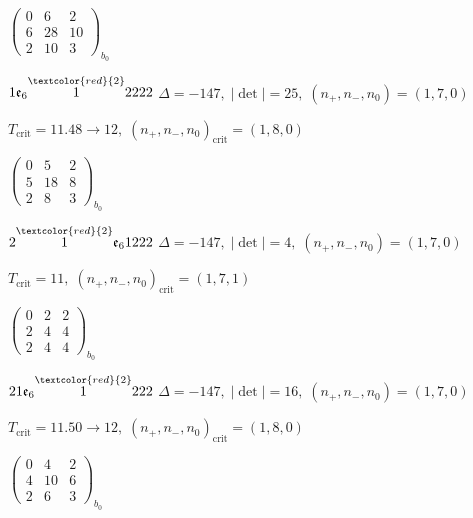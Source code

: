 \documentclass[10pt]{article}
\begin{document}
\hspace{2em}$\left(\begin{smallmatrix}0 & 6 & 2 \\ 6 & 28 & 10 \\ 2 & 10 & 3\end{smallmatrix}\right)_{\!b_0}$

\smallskip

$1\mathfrak{e}_6\overset{\textcolor{red}{2}}{1}2222$ \quad $\Delta=-147,\; |\det|=25,\; (n_+,n_-,n_0)=(1,7,0)$

\hspace{1em}$T_{\text{crit}}=11.48 \to 12,\; (n_+,n_-,n_0)_{\text{crit}}=(1,8,0)$

\hspace{2em}$\left(\begin{smallmatrix}0 & 5 & 2 \\ 5 & 18 & 8 \\ 2 & 8 & 3\end{smallmatrix}\right)_{\!b_0}$

\smallskip

$2\overset{\textcolor{red}{2}}{1}\mathfrak{e}_61222$ \quad $\Delta=-147,\; |\det|=4,\; (n_+,n_-,n_0)=(1,7,0)$

\hspace{1em}$T_{\text{crit}}=11,\; (n_+,n_-,n_0)_{\text{crit}}=(1,7,1)$

\hspace{2em}$\left(\begin{smallmatrix}0 & 2 & 2 \\ 2 & 4 & 4 \\ 2 & 4 & 4\end{smallmatrix}\right)_{\!b_0}$

$21\mathfrak{e}_6\overset{\textcolor{red}{2}}{1}222$ \quad $\Delta=-147,\; |\det|=16,\; (n_+,n_-,n_0)=(1,7,0)$

\hspace{1em}$T_{\text{crit}}=11.50 \to 12,\; (n_+,n_-,n_0)_{\text{crit}}=(1,8,0)$

\hspace{2em}$\left(\begin{smallmatrix}0 & 4 & 2 \\ 4 & 10 & 6 \\ 2 & 6 & 3\end{smallmatrix}\right)_{\!b_0}$

\smallskip
\end{document}
